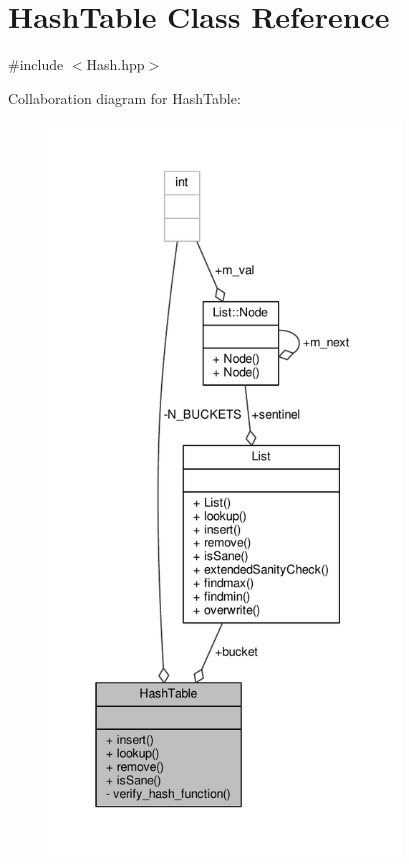 \hypertarget{classHashTable}{\section{Hash\-Table Class Reference}
\label{classHashTable}
}


{\ttfamily \#include $<$Hash.\-hpp$>$}



Collaboration diagram for Hash\-Table\-:
\nopagebreak
\begin{figure}[H]
\begin{center}
\leavevmode
\includegraphics[height=550pt]{classHashTable__coll__graph}
\end{center}
\end{figure}
